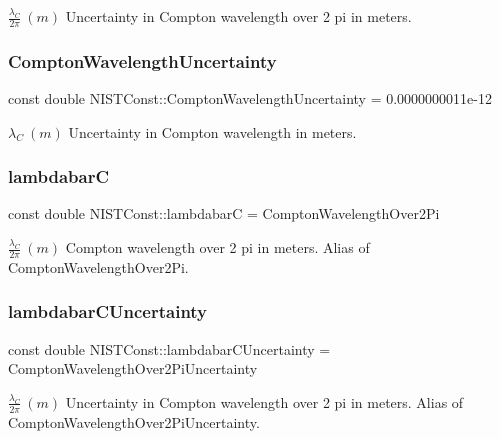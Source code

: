 $\frac{\lambda_C}{2\pi} \ (m)$ Uncertainty in Compton wavelength over 2 pi in meters. \mbox{\label{group___compton_wavelength_ga4845f956ea0bf6f4eaf7396173b09430}} 
\subsubsection{\texorpdfstring{Compton\+Wavelength\+Uncertainty}{ComptonWavelengthUncertainty}}
{\footnotesize\ttfamily const double N\+I\+S\+T\+Const\+::\+Compton\+Wavelength\+Uncertainty = 0.\+0000000011e-\/12}

$\lambda_C \ (m)$ Uncertainty in Compton wavelength in meters. \mbox{\label{group___compton_wavelength_gaeed48ca7330a4ba9227043237fed90f9}} 
\subsubsection{\texorpdfstring{lambdabarC}{lambdabarC}}
{\footnotesize\ttfamily const double N\+I\+S\+T\+Const\+::lambdabarC = Compton\+Wavelength\+Over2\+Pi}

$\frac{\lambda_C}{2\pi} \ (m)$ Compton wavelength over 2 pi in meters. Alias of Compton\+Wavelength\+Over2\+Pi. \mbox{\label{group___compton_wavelength_ga56b8e49aa3ccbfb73a500f63c9fd3b05}} 
\subsubsection{\texorpdfstring{lambdabar\+C\+Uncertainty}{lambdabarCUncertainty}}
{\footnotesize\ttfamily const double N\+I\+S\+T\+Const\+::lambdabar\+C\+Uncertainty = Compton\+Wavelength\+Over2\+Pi\+Uncertainty}

$\frac{\lambda_C}{2\pi} \ (m)$ Uncertainty in Compton wavelength over 2 pi in meters. Alias of Compton\+Wavelength\+Over2\+Pi\+Uncertainty. \mbox{\label{group___compton_wavelength_gae311e27b1f359b90efb6895ddf388a80}} 

